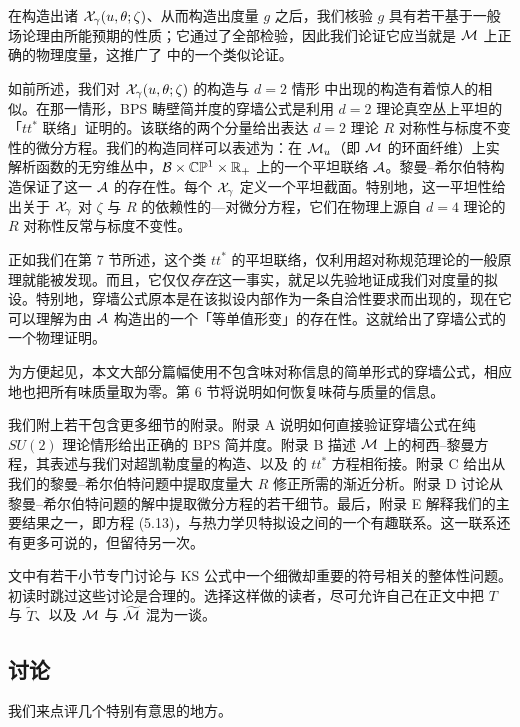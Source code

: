 在构造出诸 $\mathcal{X}_\gamma(u,\theta;\zeta)$、从而构造出度量 $g$ 之后，我们核验 $g$ 具有若干基于一般场论理由所能预期的性质；它通过了全部检验，因此我们论证它应当就是 $\mathcal{M}$ 上正确的物理度量，这推广了 \cite{Seiberg:1996nz} 中的一个类似论证。

如前所述，我们对 $\mathcal{X}_\gamma(u,\theta;\zeta)$ 的构造与 $d=2$ 情形 \cite{Cecotti:1993rm} 中出现的构造有着惊人的相似。在那一情形，BPS 畴壁简并度的穿墙公式是利用 $d=2$ 理论真空丛上平坦的「$tt^*$ 联络」证明的。该联络的两个分量给出表达 $d=2$ 理论 $R$ 对称性与标度不变性的微分方程。我们的构造同样可以表述为：在 $\mathcal{M}_u$（即 $\mathcal{M}$ 的环面纤维）上实解析函数的无穷维丛中，$\mathcal{B}\times\mathbb{C}\mathbb{P}^1\times\mathbb{R}_+$ 上的一个平坦联络 $\mathcal{A}$。黎曼--希尔伯特构造保证了这一 $\mathcal{A}$ 的存在性。每个 $\mathcal{X}_\gamma$ 定义一个平坦截面。特别地，这一平坦性给出关于 $\mathcal{X}_\gamma$ 对 $\zeta$ 与 $R$ 的依赖性的—对微分方程，它们在物理上源自 $d=4$ 理论的 $R$ 对称性反常与标度不变性。

正如我们在第 7 节所述，这个类 $tt^*$ 的平坦联络，仅利用超对称规范理论的一般原理就能被发现。而且，它仅仅\emph{存在}这一事实，就足以先验地证成我们对度量的拟设。特别地，穿墙公式原本是在该拟设内部作为一条自洽性要求而出现的，现在它可以理解为由 $\mathcal{A}$ 构造出的一个「等单值形变」的存在性。这就给出了穿墙公式的一个物理证明。

为方便起见，本文大部分篇幅使用不包含味对称信息的简单形式的穿墙公式，相应地也把所有味质量取为零。第 6 节将说明如何恢复味荷与质量的信息。

我们附上若干包含更多细节的附录。附录 A 说明如何直接验证穿墙公式在纯 $SU(2)$ 理论情形给出正确的 BPS 简并度。附录 B 描述 $\mathcal{M}$ 上的柯西--黎曼方程，其表述与我们对超凯勒度量的构造、以及 \cite{Cecotti:1991me} 的 $tt^*$ 方程相衔接。附录 C 给出从我们的黎曼--希尔伯特问题中提取度量大 $R$ 修正所需的渐近分析。附录 D 讨论从黎曼--希尔伯特问题的解中提取微分方程的若干细节。最后，附录 E 解释我们的主要结果之一，即方程 (5.13)，与热力学贝特拟设之间的一个有趣联系。这一联系还有更多可说的，但留待另一次。

文中有若干小节专门讨论与 KS 公式中一个细微却重要的符号相关的整体性问题。初读时跳过这些讨论是合理的。选择这样做的读者，尽可允许自己在正文中把 $T$ 与 $\tilde T$、以及 $\mathcal{M}$ 与 $\widetilde{\mathcal{M}}$ 混为一谈。

\subsection*{讨论}

我们来点评几个特别有意思的地方。

